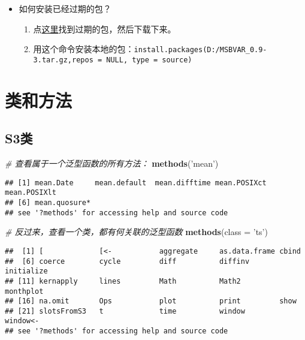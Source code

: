 \documentclass[
]{book}
\newenvironment{Shaded}{\begin{snugshade}}{\end{snugshade}}
\newcommand{\CommentTok}[1]{\textcolor[rgb]{0.56,0.35,0.01}{\textit{#1}}}
\newcommand{\DataTypeTok}[1]{\textcolor[rgb]{0.13,0.29,0.53}{#1}}
\newcommand{\KeywordTok}[1]{\textcolor[rgb]{0.13,0.29,0.53}{\textbf{#1}}}
\newcommand{\NormalTok}[1]{#1}
\newcommand{\StringTok}[1]{\textcolor[rgb]{0.31,0.60,0.02}{#1}}
\providecommand{\tightlist}{%
  \setlength{\itemsep}{0pt}\setlength{\parskip}{0pt}}
\begin{document}
\begin{itemize}
\tightlist
\item
  如何安装已经过期的包？

  \begin{enumerate}
  \def\labelenumi{\arabic{enumi}.}
  \tightlist
  \item
    点\href{https://cran.r-project.org/src/contrib/Archive/}{这里}找到过期的包，然后下载下来。
  \item
    用这个命令安装本地的包：\texttt{install.packages(\textquotesingle{}D:/MSBVAR\_0.9-3.tar.gz\textquotesingle{},repos\ =\ NULL,\ type\ =\ \textquotesingle{}source\textquotesingle{})}
  \end{enumerate}
\end{itemize}

\hypertarget{ux7c7bux548cux65b9ux6cd5}{%
\section{类和方法}\label{ux7c7bux548cux65b9ux6cd5}}

\hypertarget{s3ux7c7b}{%
\subsection{S3类}\label{s3ux7c7b}}

\begin{Shaded}
\begin{Highlighting}[]
\CommentTok{# 查看属于一个泛型函数的所有方法：}
\KeywordTok{methods}\NormalTok{(}\StringTok{'mean'}\NormalTok{)}
\end{Highlighting}
\end{Shaded}

\begin{verbatim}
## [1] mean.Date     mean.default  mean.difftime mean.POSIXct  mean.POSIXlt 
## [6] mean.quosure*
## see '?methods' for accessing help and source code
\end{verbatim}

\begin{Shaded}
\begin{Highlighting}[]
\CommentTok{# 反过来，查看一个类，都有何关联的泛型函数}
\KeywordTok{methods}\NormalTok{(}\DataTypeTok{class =} \StringTok{'ts'}\NormalTok{)}
\end{Highlighting}
\end{Shaded}

\begin{verbatim}
##  [1] [             [<-           aggregate     as.data.frame cbind        
##  [6] coerce        cycle         diff          diffinv       initialize   
## [11] kernapply     lines         Math          Math2         monthplot    
## [16] na.omit       Ops           plot          print         show         
## [21] slotsFromS3   t             time          window        window<-     
## see '?methods' for accessing help and source code
\end{verbatim}
\end{document}
